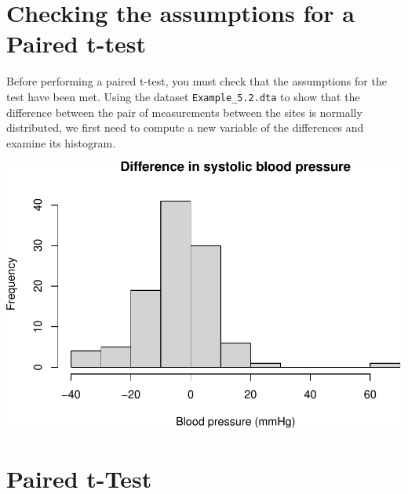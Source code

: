 \documentclass[
]{memoir}
\newenvironment{Shaded}{\begin{snugshade}}{\end{snugshade}}
\newcommand{\AttributeTok}[1]{\textcolor[rgb]{0.77,0.63,0.00}{#1}}
\newcommand{\FunctionTok}[1]{\textcolor[rgb]{0.00,0.00,0.00}{#1}}
\newcommand{\NormalTok}[1]{#1}
\newcommand{\OtherTok}[1]{\textcolor[rgb]{0.56,0.35,0.01}{#1}}
\newcommand{\SpecialCharTok}[1]{\textcolor[rgb]{0.00,0.00,0.00}{#1}}
\newcommand{\StringTok}[1]{\textcolor[rgb]{0.31,0.60,0.02}{#1}}
\begin{document}
\hypertarget{checking-the-assumptions-for-a-paired-t-test}{%
\section{Checking the assumptions for a Paired t-test}\label{checking-the-assumptions-for-a-paired-t-test}}

Before performing a paired t-test, you must check that the assumptions for the test have been met. Using the dataset \texttt{Example\_5.2.dta} to show that the difference between the pair of measurements between the sites is normally distributed, we first need to compute a new variable of the differences and examine its histogram.

\begin{Shaded}
\end{Shaded}

\includegraphics{05.1-Means-R_files/figure-latex/unnamed-chunk-8-1.pdf}

\hypertarget{paired-t-test}{%
\section{Paired t-Test}\label{paired-t-test}}
\end{document}
